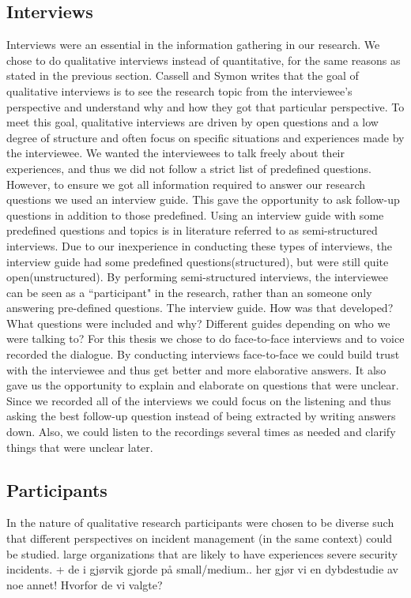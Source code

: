 \subsection{Interviews}
Interviews were an essential in the information gathering in our research. We chose to do qualitative interviews instead of quantitative, for the same reasons as stated in the previous section. Cassell and Symon writes \cite{cassell2004essential} that the goal of qualitative interviews is to see the research topic from the interviewee's perspective and understand why and how they got that particular perspective. To meet this goal, qualitative interviews are driven by open questions and a low degree of structure and often focus on specific situations and experiences made by the interviewee.
We wanted the interviewees to talk freely about their experiences, and thus we did not follow a strict list of predefined questions. However, to ensure we got all information required to answer our research questions we used an interview guide. This gave the opportunity to ask follow-up questions in addition to those predefined. Using an interview guide with some predefined questions and topics is in literature referred to as semi-structured interviews\cite{cassell2004essential}. Due to our inexperience in conducting these types of interviews, the interview guide had some predefined questions(structured), but were still quite open(unstructured). By performing semi-structured interviews, the interviewee can be seen as a ``participant" in the research, rather than an someone only answering pre-defined questions.
The interview guide. How was that developed? What questions were included and why? Different guides depending on who we were talking to?
For this thesis we chose to do face-to-face interviews and to voice recorded the dialogue. By conducting interviews face-to-face we could build trust with the interviewee and thus get better and more elaborative answers. It also gave us the opportunity to explain and elaborate on questions that were unclear. Since we recorded all of the interviews we could focus on the listening and thus asking the best follow-up question instead of being extracted by writing answers down. Also, we could listen to the recordings several times as needed and clarify things that were unclear later.
\subsection{Participants}
In the nature of qualitative research participants were chosen to be diverse such that different perspectives on incident management (in the same context) could be studied.
large organizations that are likely to have experiences severe security incidents. + de i gjørvik gjorde på small/medium.. her gjør vi en dybdestudie av noe annet!
Hvorfor de vi valgte?
